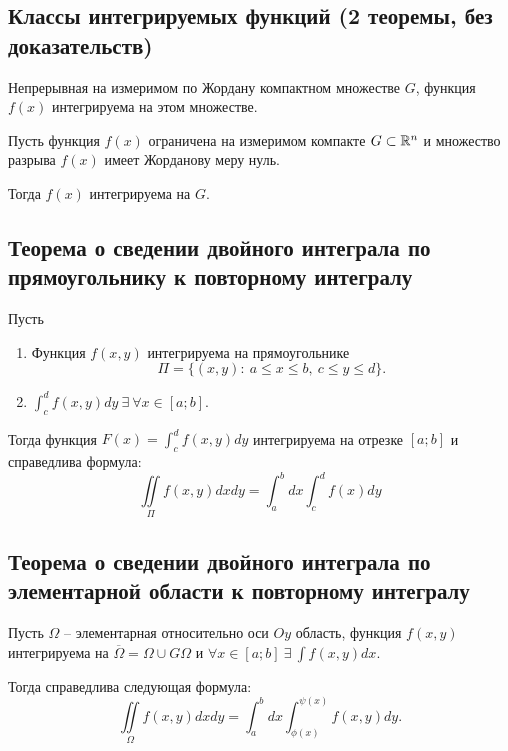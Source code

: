 \subsection{Классы интегрируемых функций (2 теоремы, без доказательств)}

\begin{theorem}
    Непрерывная на измеримом по Жордану компактном множестве $ G $, функция $ f(x) $ интегрируема на этом множестве.
\end{theorem}

\begin{theorem}
    Пусть функция $ f(x) $ ограничена на измеримом компакте $ G \subset \mathbb{R}^n $ и множество разрыва $ f(x) $ имеет Жорданову меру нуль.

    Тогда $ f(x) $ интегрируема на $ G $.
\end{theorem}

\newpage

\subsection{Теорема о сведении двойного интеграла по прямоугольнику к повторному интегралу}

\begin{theorem}
    Пусть
    \begin{enumerate}
        \item Функция $ f(x,y) $ интегрируема на прямоугольнике
              \[
                  \Pi = \big\{(x,y): \ a \leqslant x \leqslant b, \ c \leqslant y \leqslant d\big\}.
              \]

        \item $ \int_{c}^{d}f(x,y)dy \ \exists \ \forall x \in [a;b] $.
    \end{enumerate}

    Тогда функция $ F(x) = \int_{c}^{d}f(x,y)dy $ интегрируема на отрезке $ [a;b] $ и справедлива формула:
    \[
        \boxed{\iint\limits_\Pi f(x,y)dxdy = \int_{a}^{b}dx \int_{c}^{d}f(x)dy}
    \]
\end{theorem}

\subsection{Теорема о сведении двойного интеграла по элементарной области к повторному интегралу}

\begin{theorem}
    Пусть $ \Omega $ -- элементарная относительно оси $ Oy $ область, функция $ f(x,y) $ интегрируема на $ \overline{\Omega} = \Omega \cup G\Omega $ и $ \forall x \in [a;b] \ \exists \ \int f(x,y)dx $.

    Тогда справедлива следующая формула:
    \begin{equation}\label{eq:for_proof9}
        \iint\limits_\Omega f(x,y)dxdy = \int_{a}^{b}dx \int_{\phi(x)}^{\psi(x)}f(x,y)dy.
    \end{equation}
\end{theorem}

